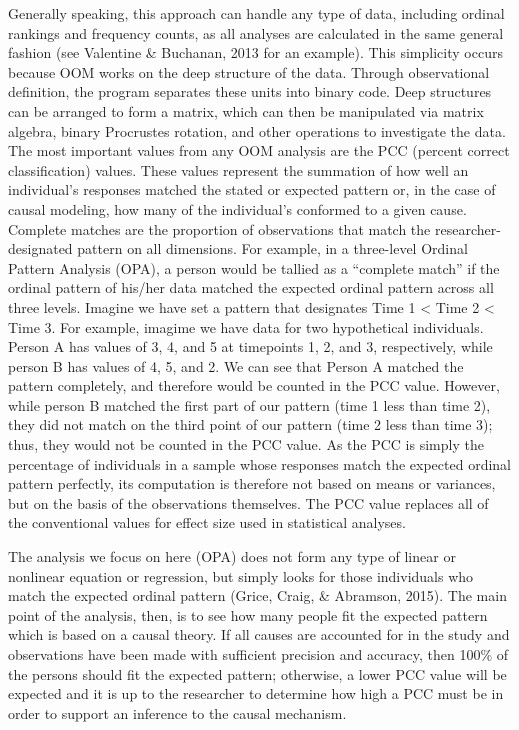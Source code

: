 \documentclass[english,man]{apa6}
\theoremstyle{definition}
\theoremstyle{definition}
\theoremstyle{definition}
\theoremstyle{remark}
\begin{document}
Generally speaking, this approach can handle any type of data, including
ordinal rankings and frequency counts, as all analyses are calculated in
the same general fashion (see Valentine \& Buchanan, 2013 for an
example). This simplicity occurs because OOM works on the deep structure
of the data. Through observational definition, the program separates
these units into binary code. Deep structures can be arranged to form a
matrix, which can then be manipulated via matrix algebra, binary
Procrustes rotation, and other operations to investigate the data. The
most important values from any OOM analysis are the PCC (percent correct
classification) values. These values represent the summation of how well
an individual's responses matched the stated or expected pattern or, in
the case of causal modeling, how many of the individual's conformed to a
given cause. Complete matches are the proportion of observations that
match the researcher-designated pattern on all dimensions. For example,
in a three-level Ordinal Pattern Analysis (OPA), a person would be
tallied as a \enquote{complete match} if the ordinal pattern of his/her
data matched the expected ordinal pattern across all three levels.
Imagine we have set a pattern that designates Time 1 \textless{} Time 2
\textless{} Time 3. For example, imagime we have data for two
hypothetical individuals. Person A has values of 3, 4, and 5 at
timepoints 1, 2, and 3, respectively, while person B has values of 4, 5,
and 2. We can see that Person A matched the pattern completely, and
therefore would be counted in the PCC value. However, while person B
matched the first part of our pattern (time 1 less than time 2), they
did not match on the third point of our pattern (time 2 less than time
3); thus, they would not be counted in the PCC value. As the PCC is
simply the percentage of individuals in a sample whose responses match
the expected ordinal pattern perfectly, its computation is therefore not
based on means or variances, but on the basis of the observations
themselves. The PCC value replaces all of the conventional values for
effect size used in statistical analyses.

The analysis we focus on here (OPA) does not form any type of linear or
nonlinear equation or regression, but simply looks for those individuals
who match the expected ordinal pattern (Grice, Craig, \& Abramson,
2015). The main point of the analysis, then, is to see how many people
fit the expected pattern which is based on a causal theory. If all
causes are accounted for in the study and observations have been made
with sufficient precision and accuracy, then 100\% of the persons should
fit the expected pattern; otherwise, a lower PCC value will be expected
and it is up to the researcher to determine how high a PCC must be in
order to support an inference to the causal mechanism.
\end{document}
